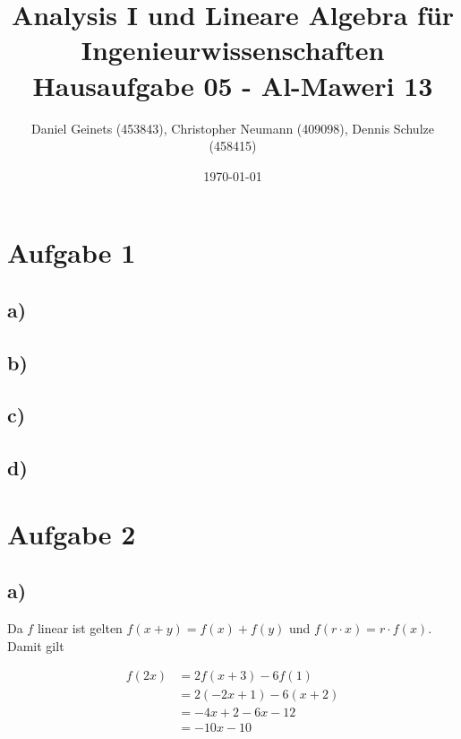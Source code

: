 \documentclass[a4paper, 11pt]{article}
\author{Daniel Geinets (453843), Christopher Neumann (409098), Dennis Schulze (458415)}
\date{\today}
\title{Analysis I und Lineare Algebra für Ingenieurwissenschaften \large  \\ Hausaufgabe 05 - Al-Maweri 13}
\begin{document}
\maketitle
\tableofcontents

\setcounter{secnumdepth}{0}
\newcommand{\tuple}[1]{\left(#1\right)}
\renewcommand{\cfrac}[3]{#1 \tuple{\frac{#2}{#3}}}
\newcommand{\R}{\mathbb{R}}
\newcommand{\Z}{\mathbb{Z}}
\newcommand{\Q}{\mathbb{Q}}
\newcommand{\N}{\mathbb{N}}
\newcommand{\C}{\mathbb{C}}

\makeatletter
\renewcommand*\env@matrix[1][*\c@MaxMatrixCols c]{%
\hskip -\arraycolsep
\let\@ifnextchar\new@ifnextchar
\array{#1}}
\makeatother

\pagebreak

\section{Aufgabe 1}
\label{sec:orga0c3e2d}
\subsection{a)}
\label{sec:org3fcda91}

\subsection{b)}
\label{sec:orga68695b}

\subsection{c)}
\label{sec:orge885b6b}

\subsection{d)}
\label{sec:org4efad33}

\section{Aufgabe 2}
\label{sec:org6df848f}
\subsection{a)}
\label{sec:org0dbd1ab}
Da \(f\) linear ist gelten \(f(x+y) = f(x) + f(y)\) und
\(f(r \cdot x) = r \cdot f(x)\). Damit gilt

\begin{align*}
    f(2x) &= 2f(x + 3) - 6 f(1) \\
    &= 2(-2x + 1) - 6(x + 2) \\
    &= -4x + 2 - 6x - 12 \\
    &= -10x - 10
\end{align*}
\end{document}
